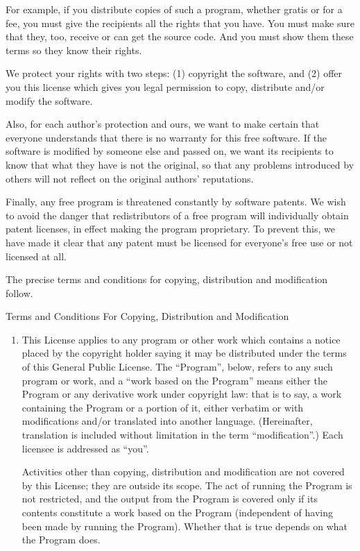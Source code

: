 \begin{lrbox}{\gpl}
\begin{minipage}{3\textwidth}
\begin{multicols}{3}
For example, if you distribute copies of such a program, whether gratis or
for a fee, you must give the recipients all the rights that you have.  You
must make sure that they, too, receive or can get the source code.  And
you must show them these terms so they know their rights.

We protect your rights with two steps: (1) copyright the software, and (2)
offer you this license which gives you legal permission to copy,
distribute and/or modify the software.

Also, for each author's protection and ours, we want to make certain that
everyone understands that there is no warranty for this free software.  If
the software is modified by someone else and passed on, we want its
recipients to know that what they have is not the original, so that any
problems introduced by others will not reflect on the original authors'
reputations.

Finally, any free program is threatened constantly by software patents.
We wish to avoid the danger that redistributors of a free program will
individually obtain patent licenses, in effect making the program
proprietary.  To prevent this, we have made it clear that any patent must
be licensed for everyone's free use or not licensed at all.

The precise terms and conditions for copying, distribution and
modification follow.

\begin{center}
{\Large \sc Terms and Conditions For Copying, Distribution and
  Modification}
\end{center}

\begin{enumerate}
\item
This License applies to any program or other work which contains a notice
placed by the copyright holder saying it may be distributed under the
terms of this General Public License.  The ``Program'', below, refers to
any such program or work, and a ``work based on the Program'' means either
the Program or any derivative work under copyright law: that is to say, a
work containing the Program or a portion of it, either verbatim or with
modifications and/or translated into another language.  (Hereinafter,
translation is included without limitation in the term ``modification''.)
Each licensee is addressed as ``you''.

Activities other than copying, distribution and modification are not
covered by this License; they are outside its scope.  The act of
running the Program is not restricted, and the output from the Program
is covered only if its contents constitute a work based on the
Program (independent of having been made by running the Program).
Whether that is true depends on what the Program does.


\end{enumerate}
\end{multicols}
\end{minipage}
\end{lrbox}
